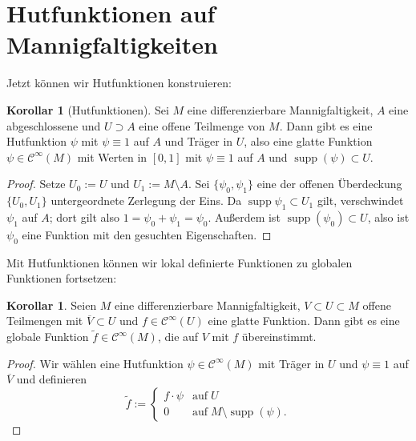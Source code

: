 \documentclass[a4paper]{scrbook}
\numberwithin{equation}{chapter}
\DeclareMathOperator{\supp}{supp}
\newcommand{\sC}{\mathcal{C}^{\infty}}
\theoremstyle{definition}
\newtheorem{kor}[defn]{Korollar}
\begin{document}
\section{Hutfunktionen auf Mannigfaltigkeiten}
Jetzt können wir Hutfunktionen konstruieren:
\begin{kor}[Hutfunktionen]
	Sei $M$ eine differenzierbare Mannigfaltigkeit, $A$ eine abgeschlossene und $U \supset A$ eine offene Teilmenge von $M$. Dann gibt es eine Hutfunktion $\psi$ mit $\psi \equiv 1$ auf $A$ und Träger in $U$, also eine glatte Funktion $\psi \in \sC(M)$ mit Werten in $[0,1]$ mit $\psi \equiv 1$ auf $A$ und $\supp(\psi) \subset U$.

	\begin{proof}
		Setze $U_0 := U$ und $U_1 := M \setminus A$. Sei $\{\psi_0, \psi_1\}$ eine der offenen Überdeckung $\{U_0, U_1\}$ untergeordnete Zerlegung der Eins. Da $\supp{\psi_1} \subset U_1$ gilt, verschwindet $\psi_1$ auf $A$; dort gilt also $1 = \psi_0 + \psi_1 = \psi_0$. Außerdem ist $\supp(\psi_0) \subset U$, also ist $\psi_0$ eine Funktion mit den gesuchten Eigenschaften.
	\end{proof}
\end{kor}

Mit Hutfunktionen können wir lokal definierte Funktionen zu globalen Funktionen fortsetzen:
\begin{kor}
	Seien $M$ eine differenzierbare Mannigfaltigkeit, $V \subset U \subset M$ offene Teilmengen mit $\overline{V} \subset U$ und $f \in \sC(U)$ eine glatte Funktion. Dann gibt es eine globale Funktion $\tilde f \in \sC(M)$, die auf $V$ mit $f$ übereinstimmt.

	\begin{proof}
		Wir wählen eine Hutfunktion $\psi \in \sC(M)$ mit Träger in $U$ und $\psi \equiv 1$ auf $\overline{V}$ und definieren
		\[\tilde f := \begin{cases}
		f \cdot \psi & \text{auf} \; U\\
		0 & \text{auf} \; M \setminus \supp(\psi).
		\end{cases}\]
	\end{proof}
\end{kor}
\end{document}
